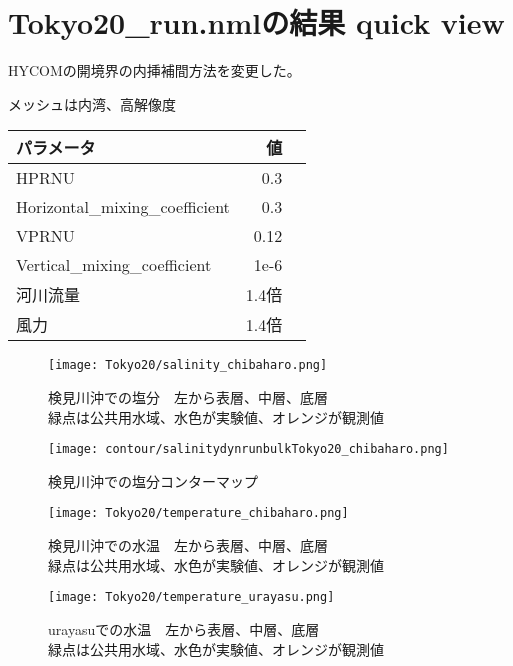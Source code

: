 \documentclass[fontsize=12pt,paper=a4]{jlreq}
\begin{document}
\section{Tokyo20\_run.nmlの結果 quick view}
HYCOMの開境界の内挿補間方法を変更した。

メッシュは内湾、高解像度
\begin{table}
  \begin{minipage}[hbtp]{0.5\hsize}
    \begin{tabular}{lrr} \toprule
      パラメータ & 値 \\ \midrule
      HPRNU & 0.3\\
      Horizontal\_mixing\_coefficient & 0.3\\
      VPRNU & 0.12\\
      Vertical\_mixing\_coefficient & 1e-6\\
      河川流量 & 1.4倍 \\
      風力 & 1.4倍\\ \bottomrule
    \end{tabular}
  \end{minipage}
\end{table}

\begin{figure}[hbtp]
        \centering
        \texttt{[image: Tokyo20/salinity\_chibaharo.png]}
        \caption{検見川沖での塩分　左から表層、中層、底層\\緑点は公共用水域、水色が実験値、オレンジが観測値}
\end{figure}

\begin{figure}[hbtp]
        \centering
        \texttt{[image: contour/salinitydynrunbulkTokyo20\_chibaharo.png]}
        \caption{検見川沖での塩分コンターマップ}
\end{figure}


\begin{figure}[hbtp]
        \centering
        \texttt{[image: Tokyo20/temperature\_chibaharo.png]}
        \caption{検見川沖での水温　左から表層、中層、底層\\緑点は公共用水域、水色が実験値、オレンジが観測値}
\end{figure}
\begin{figure}[hbtp]
  \centering
  \texttt{[image: Tokyo20/temperature\_urayasu.png]}
  \caption{urayasuでの水温　左から表層、中層、底層\\緑点は公共用水域、水色が実験値、オレンジが観測値}
\end{figure}
\end{document}

